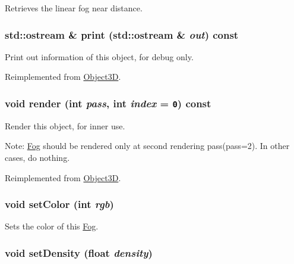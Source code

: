 Retrieves the linear fog near distance. \hypertarget{classm3g_1_1Fog_6fea17fa1532df3794f8cb39cb4f911f}{
\subsubsection[{print}]{\setlength{\rightskip}{0pt plus 5cm}std::ostream \& print (std::ostream \& {\em out}) const}}
\label{classm3g_1_1Fog_6fea17fa1532df3794f8cb39cb4f911f}


Print out information of this object, for debug only. 

Reimplemented from \hyperlink{classm3g_1_1Object3D_6fea17fa1532df3794f8cb39cb4f911f}{Object3D}.\hypertarget{classm3g_1_1Fog_1efcb1973989d9963d5bd6d03065d389}{
\subsubsection[{render}]{\setlength{\rightskip}{0pt plus 5cm}void render (int {\em pass}, \/  int {\em index} = {\tt 0}) const}}
\label{classm3g_1_1Fog_1efcb1973989d9963d5bd6d03065d389}


Render this object, for inner use.

Note: \hyperlink{classm3g_1_1Fog}{Fog} should be rendered only at second rendering pass(pass=2). In other cases, do nothing. 

Reimplemented from \hyperlink{classm3g_1_1Object3D_1efcb1973989d9963d5bd6d03065d389}{Object3D}.\hypertarget{classm3g_1_1Fog_b1f5cc0f5cc6bbbd716a526c61f1081d}{
\subsubsection[{setColor}]{\setlength{\rightskip}{0pt plus 5cm}void setColor (int {\em rgb})}}
\label{classm3g_1_1Fog_b1f5cc0f5cc6bbbd716a526c61f1081d}


Sets the color of this \hyperlink{classm3g_1_1Fog}{Fog}. \hypertarget{classm3g_1_1Fog_0ceeda25e326e99d6e971e980a00bd49}{
\subsubsection[{setDensity}]{\setlength{\rightskip}{0pt plus 5cm}void setDensity (float {\em density})}}
\label{classm3g_1_1Fog_0ceeda25e326e99d6e971e980a00bd49}


